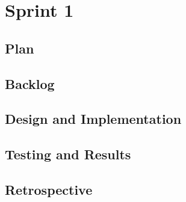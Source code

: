 \section{Sprint 1}
\subsection{Plan}
\subsection{Backlog}
\subsection{Design and Implementation}
\subsection{Testing and Results}
\subsection{Retrospective}
